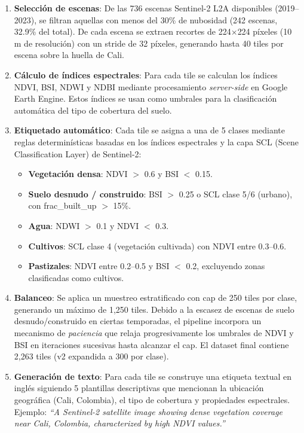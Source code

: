 \documentclass[10pt,a4paper,twocolumn]{article}
\begin{document}
\begin{enumerate}[nosep, leftmargin=*, itemsep=2pt]
  \item \textbf{Selección de escenas}: De las 736 escenas Sentinel-2 L2A disponibles (2019--2023), se filtran aquellas con menos del 30\% de nubosidad (242 escenas, 32.9\% del total). De cada escena se extraen recortes de 224$\times$224 píxeles (10 m de resolución) con un stride de 32 píxeles, generando hasta 40 tiles por escena sobre la huella de Cali.
  \item \textbf{Cálculo de índices espectrales}: Para cada tile se calculan los índices NDVI, BSI, NDWI y NDBI mediante procesamiento \textit{server-side} en Google Earth Engine. Estos índices se usan como umbrales para la clasificación automática del tipo de cobertura del suelo.
  \item \textbf{Etiquetado automático}: Cada tile se asigna a una de 5 clases mediante reglas determinísticas basadas en los índices espectrales y la capa SCL (Scene Classification Layer) de Sentinel-2:
  \begin{itemize}[nosep, leftmargin=*, itemsep=1pt]
    \item \textbf{Vegetación densa}: NDVI $>$ 0.6 y BSI $<$ 0.15.
    \item \textbf{Suelo desnudo / construido}: BSI $>$ 0.25 o SCL clase 5/6 (urbano), con frac\_built\_up $>$ 15\%.
    \item \textbf{Agua}: NDWI $>$ 0.1 y NDVI $<$ 0.3.
    \item \textbf{Cultivos}: SCL clase 4 (vegetación cultivada) con NDVI entre 0.3--0.6.
    \item \textbf{Pastizales}: NDVI entre 0.2--0.5 y BSI $<$ 0.2, excluyendo zonas clasificadas como cultivos.
  \end{itemize}
  \item \textbf{Balanceo}: Se aplica un muestreo estratificado con cap de 250 tiles por clase, generando un máximo de 1,250 tiles. Debido a la escasez de escenas de suelo desnudo/construido en ciertas temporadas, el pipeline incorpora un mecanismo de \textit{paciencia} que relaja progresivamente los umbrales de NDVI y BSI en iteraciones sucesivas hasta alcanzar el cap. El dataset final contiene 2,263 tiles (v2 expandida a 300 por clase).
  \item \textbf{Generación de texto}: Para cada tile se construye una etiqueta textual en inglés siguiendo 5 plantillas descriptivas que mencionan la ubicación geográfica (Cali, Colombia), el tipo de cobertura y propiedades espectrales. Ejemplo: \textit{``A Sentinel-2 satellite image showing dense vegetation coverage near Cali, Colombia, characterized by high NDVI values.''}
\end{enumerate}
\end{document}
